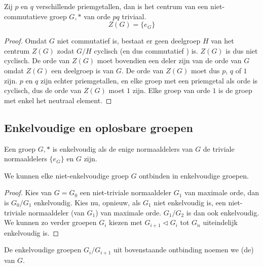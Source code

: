 \documentclass[main.tex]{subfiles}
\begin{document}
\begin{gev}
  Zij $p$ en $q$ verschillende priemgetallen, dan is het centrum van een niet-commutatieve groep $G,*$ van orde $pq$ triviaal.
  \[ Z(G) = \{ e_{G} \} \]

  \begin{proof}
    Omdat $G$ niet commutatief is, bestaat er geen deelgroep $H$ van het centrum $Z(G)$ zodat $G/H$ cyclisch (en dus commutatief ) is.
    $Z(G)$ is dus niet cyclisch.
    De orde van $Z(G)$ moet bovendien een deler zijn van de orde van $G$ omdat $Z(G)$ een deelgroep is van $G$. 
    De orde van $Z(G)$ moet dus $p$, $q$ of $1$ zijn. $p$ en $q$ zijn echter priemgetallen, en elke groep met een priemgetal als orde is cyclisch, dus de orde van $Z(G)$ moet $1$ zijn.
    Elke groep van orde $1$ is de groep met enkel het neutraal element.
    \waarom
  \end{proof}
\end{gev}

\subsection{Enkelvoudige en oplosbare groepen}
\label{sec:enkelv-en-oplosb}

\begin{de}
  Een groep $G,*$ is enkelvoudig als de enige normaaldelers van $G$ de triviale normaaldelers $\{e_{G}\}$ en $G$ zijn.
\end{de}

\begin{st}
  We kunnen elke niet-enkelvoudige groep $G$ ontbinden in enkelvoudige groepen.
  \begin{proof}
    Kies van $G=G_{0}$ een niet-triviale normaaldeler $G_{1}$ van maximale orde, dan is $G_{0}/G_{1}$ enkelvoudig.
\waarom
    Kies nu, opnieuw, als $G_{1}$ niet enkelvoudig is, een niet-triviale normaaldeler (van $G_{1}$) van maximale orde.
    $G_{1}/G_{2}$ is dan ook enkelvoudig.
\waarom
    We kunnen zo verder groepen $G_{i}$ kiezen met $G_{i+1} \triangleleft G_{i}$ tot $G_{n}$ uiteindelijk enkelvoudig is.
  \end{proof}
\end{st}

\begin{de}
  De enkelvoudige groepen $G_{i}/G_{i+1}$ uit bovenstaande ontbinding noemen we (de)  van $G$.
\end{de}
\end{document}
